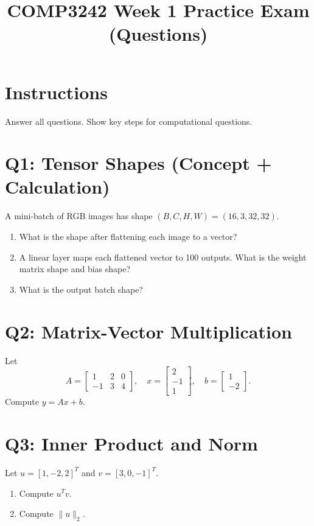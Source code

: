 \documentclass[11pt]{article}
\title{COMP3242 Week 1 Practice Exam (Questions)}
\date{}
\begin{document}
\maketitle

\section*{Instructions}
Answer all questions. Show key steps for computational questions.

\section*{Q1: Tensor Shapes (Concept + Calculation)}
A mini-batch of RGB images has shape $(B, C, H, W) = (16, 3, 32, 32)$.
\begin{enumerate}[label=(\alph*)]
  \item What is the shape after flattening each image to a vector?
  \item A linear layer maps each flattened vector to 100 outputs. What is the weight matrix shape and bias shape?
  \item What is the output batch shape?
\end{enumerate}

\section*{Q2: Matrix-Vector Multiplication}
Let
\[
A=\begin{bmatrix}1&2&0\\-1&3&4\end{bmatrix},\quad x=\begin{bmatrix}2\\-1\\1\end{bmatrix},\quad b=\begin{bmatrix}1\\-2\end{bmatrix}.
\]
Compute $y=Ax+b$.

\section*{Q3: Inner Product and Norm}
Let $u=[1,-2,2]^T$ and $v=[3,0,-1]^T$.
\begin{enumerate}[label=(\alph*)]
  \item Compute $u^Tv$.
  \item Compute $\lVert u\rVert_2$.
\end{enumerate}
\end{document}
